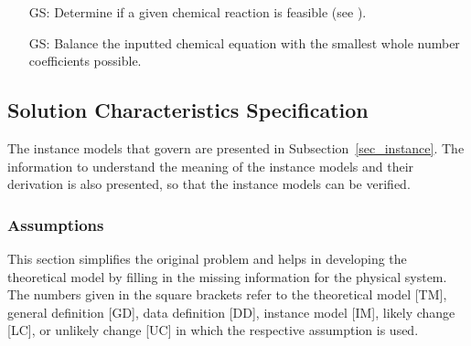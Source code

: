 \documentclass[12pt]{article}
\newcounter{goalnum} %
\begin{document}
\begin{itemize}

  \item[GS\refstepcounter{goalnum}\thegoalnum \label{G_feasible}:] Determine if
    a given chemical reaction is feasible (see ).

  \item[GS\refstepcounter{goalnum}\thegoalnum \label{G_balance}:] Balance the
    inputted chemical equation with the smallest whole number coefficients
    possible.

\end{itemize}

\subsection{Solution Characteristics Specification}

%
%

The instance models that govern \progname{} are presented in
Subsection~\ref{sec_instance}.  The information to understand the meaning of the
instance models and their derivation is also presented, so that the instance
models can be verified.

\subsubsection{Assumptions} \label{sec_assumps}

This section simplifies the original problem and helps in developing the
theoretical model by filling in the missing information for the physical
system. The numbers given in the square brackets refer to the theoretical model
  [TM], general definition [GD], data definition [DD], instance model [IM],
likely change [LC], or unlikely change [UC] in which the respective assumption
is used.
\end{document}
